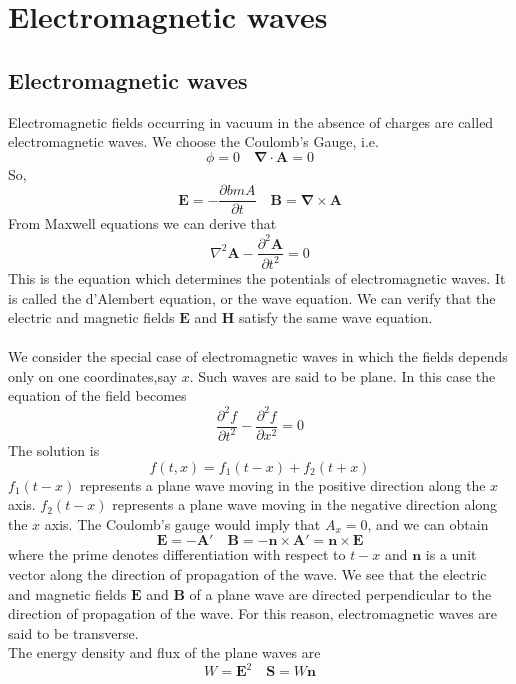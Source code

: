 \section{Electromagnetic waves}
\subsection{Electromagnetic waves}
Electromagnetic fields occurring in vacuum in the absence of  charges are called electromagnetic waves. We choose the Coulomb's Gauge, i.e.
\[ \phi = 0 \quad \bm{\nabla} \cdot \bm{A} = 0\]
So,
\[\bm{E} = -\frac{\partial bm{A}}{\partial t} \quad \bm{B} = \bm{\nabla} \times \bm{A}\]
From Maxwell equations we can derive that
\[\nabla^2 \bm{A} - \frac{\partial^2 \bm{A}}{\partial t^2} = 0\]
This is the equation which determines the potentials of electromagnetic waves. It is called the d'Alembert equation, or the wave equation. We can verify that the electric and magnetic fields $\bm{E}$ and $\bm{H}$ satisfy the same wave equation.
\\ \\
We consider the special case of electromagnetic waves in which the fields depends only on one coordinates,say $x$. Such waves are said to be plane. In this case the equation of the field becomes
\[\frac{\partial^2 f}{\partial t^2}  - \frac{\partial^2 f}{\partial x^2} = 0\]
The solution is
\[f(t,x) = f_1(t-x) + f_2(t+x)\]
$f_1(t-x)$ represents a plane wave moving in the positive direction along the $x$ axis. $f_2(t-x)$ represents a plane wave moving in the negative direction along the $x$ axis. The Coulomb's gauge would imply that $A_x = 0$, and we can obtain
\[\bm{E} = -\bm{A}' \quad \bm{B} = -\bm{n} \times \bm{A}' = \bm{n} \times \bm{E}\]
where the prime denotes differentiation with respect to $t-x$ and $\bm{n}$ is a unit vector along the direction of propagation of the wave. We see that the electric and magnetic fields $\bm{E}$ and $\bm{B}$ of a plane wave are directed perpendicular to the direction of propagation of the wave. For this reason, electromagnetic waves are said to be transverse.\\
The energy density and flux of the plane waves are
\[W = \bm{E}^2 \quad \bm{S} = W\bm{n}\]

